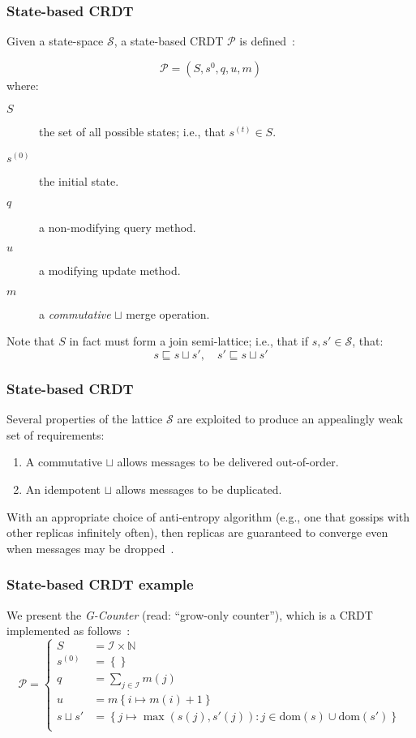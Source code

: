\documentclass[aspectratio=169,compress]{beamer}
\begin{document}
  \begin{frame}
    \frametitle{State-based CRDT}

    Given a state-space $\mathcal{S}$, a state-based CRDT $\mathcal{P}$ is
    defined~\parencite{shapiro11}:

    \[
      \mathcal{P} = (S, s^0, q, u, m)
    \]
    where:
    \begin{description}
      \item[$S$] the set of all possible states; i.e., that $s^{(t)} \in S$.
      \item[$s^{(0)}$] the initial state.
      \item[$q$] a non-modifying query method.
      \item[$u$] a modifying update method.
      \item[$m$] a \textit{commutative} $\sqcup$ merge operation.
    \end{description}

    \vspace{1em}

    Note that $S$ in fact must form a join semi-lattice; i.e., that if $s, s'
    \in \mathcal{S}$, that:
    \[
      s \sqsubseteq s \sqcup s',\quad s' \sqsubseteq s \sqcup s'
    \]
  \end{frame}

  \begin{frame}
    \frametitle{State-based CRDT}

    Several properties of the lattice $\mathcal{S}$ are exploited to produce an
    appealingly weak set of requirements:
    \begin{enumerate}
      \item A commutative $\sqcup$ allows messages to be delivered out-of-order.
      \item An idempotent $\sqcup$ allows messages to be duplicated.
    \end{enumerate}

    With an appropriate choice of anti-entropy algorithm (e.g., one that gossips
    with other replicas infinitely often), then replicas are guaranteed to
    converge even when messages may be dropped~\citep{shapiro11}.
  \end{frame}

  \begin{frame}
    \frametitle{State-based CRDT example}

    We present the \textit{G-Counter} (read: ``grow-only counter''), which is a
    CRDT implemented as follows~\citep{almeida16}:
    \[
      \mathcal{P} = \left\{\begin{aligned}
        S &= \mathcal{I} \times \mathbb{N} \\
        s^{(0)} &= \left\{ \right\} \\
        q &= \sum_{j \in \mathcal{I}} m(j) \\
        u &= m\left\{ i \mapsto m(i) + 1 \right\} \\
        s \sqcup s' &= \left\{ j \mapsto \max(s(j), s'(j)) : j \in \text{dom}(s)
        \cup \text{dom}(s') \right\} \\
      \end{aligned}\right.
    \]
  \end{frame}
\end{document}
